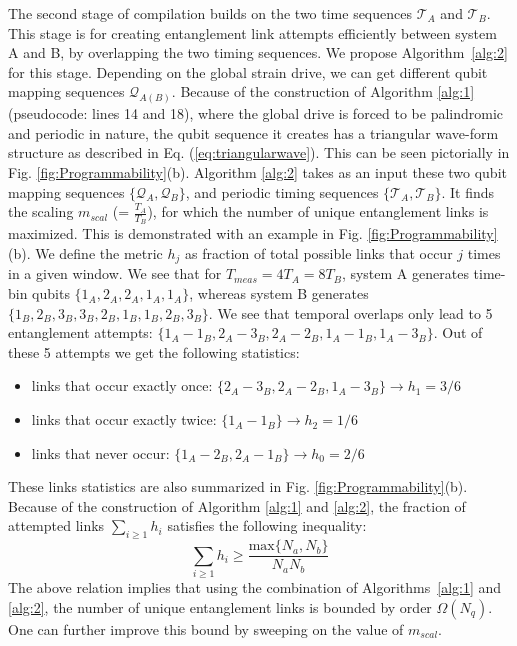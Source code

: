 \documentclass[%
 reprint,
 superscriptaddress,
 amsmath,amssymb,
 aps,
 prx,
]{revtex4-2}
\begin{document}
The second stage of compilation builds on the two time sequences $\mathcal{T}_{A}$ and $\mathcal{T}_{B}$. This stage is for creating entanglement link attempts efficiently between system A and B, by overlapping the two timing sequences. We propose Algorithm~\ref{alg:2} for this stage. Depending on the global strain drive, we can get different qubit mapping sequences $\mathcal{Q}_{A(B)}$. Because of the construction of Algorithm \ref{alg:1} (pseudocode: lines 14 and 18), where the global drive is forced to be palindromic and periodic in nature, the qubit sequence it creates has a triangular wave-form structure as described in Eq. (\ref{eq:triangularwave}). This can be seen pictorially in Fig. \ref{fig:Programmability}(b). Algorithm \ref{alg:2} takes as an input these two qubit mapping sequences $\{\mathcal{Q}_{A},\mathcal{Q}_{B}\}$, and periodic timing sequences $\{\mathcal{T}_{A},\mathcal{T}_{B}\}$. It finds the scaling $m_{scal}$ (= $\frac{T_{A}}{T_{B}}$), for which the number of unique entanglement links is maximized. This is demonstrated with an example in Fig. \ref{fig:Programmability}(b). We define the metric $h_{j}$ as fraction of total possible links that occur $j$ times in a given window. We see that for $T_{meas}=4T_{A}=8T_{B}$, system A generates time-bin qubits $\{1_{A}, 2_{A}, 2_{A}, 1_{A}, 1_{A}\}$, whereas system B generates $\{1_{B}, 2_{B}, 3_{B}, 3_{B}, 2_{B}, 1_{B}, 1_{B}, 2_{B}, 3_{B}\}$. We see that temporal overlaps only lead to 5 entanglement attempts: $\{1_{A}-1_{B}, 2_{A}-3_{B}, 2_{A}-2_{B}, 1_{A}-1_{B}, 1_{A}-3_{B}\}$.\newline 
Out of these 5 attempts we get the following statistics:\\ 
\begin{itemize}
    \item links that occur exactly once:  $\{2_{A}-3_{B}, 2_{A}-2_{B}, 1_{A}-3_{B} \}\to h_{1} = 3/6$
    \item links that occur exactly twice:  $\{1_{A}-1_{B}\}\to h_{2} = 1/6$
    \item links that never occur:  $\{1_{A}-2_{B}, 2_{A}-1_{B}\}\to h_{0} = 2/6$
\end{itemize}
These links statistics are also summarized in Fig. \ref{fig:Programmability}(b). Because of the construction of Algorithm \ref{alg:1} and \ref{alg:2}, the fraction of attempted links $\sum_{i\ge1}h_{i}$ satisfies the following inequality:
\begin{equation}
    \sum_{i\ge1}h_{i} \ge \frac{\text{max}\{ N_{a},N_{b}\}}{N_{a}N_{b}}
\end{equation}
The above relation implies that using the combination of Algorithms~\ref{alg:1} and \ref{alg:2}, the number of unique entanglement links is bounded by order $\Omega(N_q)$. One can further improve this bound by sweeping on the value of $m_{scal}$.
\end{document}
